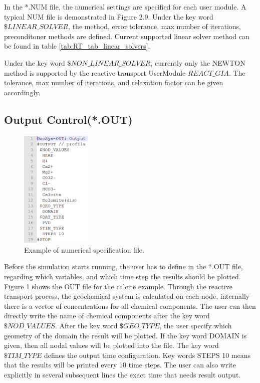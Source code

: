 In the *.NUM file, the numerical settings are specified for each user module. A typical NUM file is demonstrated in Figure 2.9. Under the key word $\$LINEAR\_SOLVER$, the method, error tolerance, max number of iterations, preconditoner methods are defined. Current supported linear solver method can be found in table \ref{tab:RT_tab_linear_solvers}. 

Under the key word $\$NON\_LINEAR\_SOLVER$, currently only the NEWTON method is supported by the reactive transport UserModule $REACT\_GIA$.  The tolerance, max number of iterations, and relaxation factor can be given accordingly. 


\subsection{Output Control(*.OUT)}

\begin{figure}
\includegraphics[width=0.3\textwidth]{RT/figs/RT_fig_out_file}
\caption{Example of numerical specification file. }
\label{fig:RT_fig_out_file}
\end{figure}

Before the simulation starts running, the user has to define in the *.OUT file, regarding which variables, and which time step the results should be plotted. Figure \ref{fig:RT_fig_out_file} shows the OUT file for the calcite example. Through the reactive transport process, the geochemical system is calculated on each node, internally there is a vector of concentrations for all chemical components. The user can then directly write the name of chemical components after the key word $\$NOD\_VALUES$. After the key word $\$GEO\_TYPE$, the user specify which geometry of the domain the result will be plotted. If the key word DOMAIN is given, then all nodal values will be plotted into the file. The key word $\$TIM\_TYPE$ defines the output time configuration. Key words STEPS 10 means that the results will be printed every 10 time steps. The user can also write explicitly in several subsequent lines the exact time that needs result output.   

